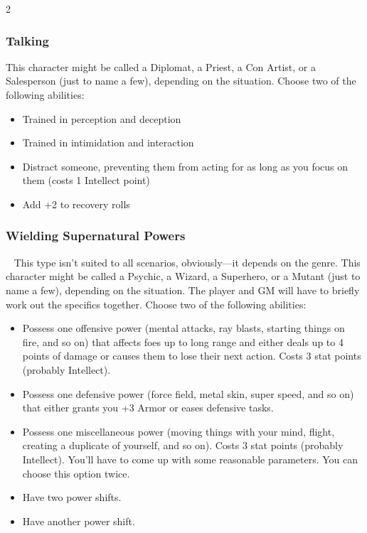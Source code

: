 \begin{multicols}{2}
\subsubsection{Talking}

This character might be called a Diplomat, a Priest, a Con Artist, or a Salesperson (just to name a few), depending on the situation. Choose two of the following abilities:

\begin{itemize}
\item Trained in perception and deception
\item Trained in intimidation and interaction 
\item Distract someone, preventing them from acting for as long as you focus on them (costs 1 Intellect point) 
\item Add +2 to recovery rolls
\end{itemize}

\subsubsection{Wielding Supernatural Powers}
 
This type isn’t suited to all scenarios, obviously—it depends on the genre. This character might be called a Psychic, a Wizard, a Superhero, or a Mutant (just to name a few), depending on the situation. The player and GM will have to briefly work out the specifics together. Choose two of the following abilities:

\begin{itemize}
\item Possess one offensive power (mental attacks, ray blasts, starting things on fire, and so on) that affects foes up to long range and either deals up to 4 points of damage or causes them to lose their next action. Costs 3 stat points (probably Intellect).
\item Possess one defensive power (force field, metal skin, super speed, and so on) that either grants you +3 Armor or eases defensive tasks.
\item Possess one miscellaneous power (moving things with your mind, flight, creating a duplicate of yourself, and so on). Costs 3 stat points (probably Intellect). You’ll have to come up with some reasonable parameters. You can choose this option twice.
\item Have two power shifts.
\item Have another power shift.
\end{itemize}


\end{multicols}
